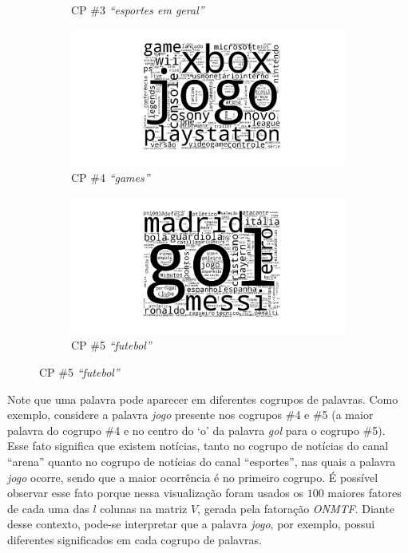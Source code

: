 \documentclass[
    12pt,                %
    oneside,            %
    a4paper,            %
    english,            %
    brazil                %
    ]{abntex2ppgsi}
\begin{document}
\begin{figure}[H]
\begin{subfigure}[b]{0.45\textwidth}
        \caption{CP \#3 \textit{``esportes em geral''}}
    \end{subfigure}
    \begin{subfigure}[b]{0.45\textwidth}
        \includegraphics[width=\textwidth]{img/onmtf-tc-4.png}
        \caption{CP \#4 \textit{``games''}}
    \end{subfigure}
    \begin{subfigure}[b]{0.45\textwidth}
        \includegraphics[width=\textwidth]{img/onmtf-tc-5.png}
        \caption{CP \#5 \textit{``futebol''}}
    \end{subfigure}
\label{fig:onmtf:wordcloud}
\end{figure}

Note que uma palavra pode aparecer em diferentes cogrupos de palavras. Como exemplo, considere a palavra \textit{jogo} presente nos cogrupos \#4 e \#5 (a maior palavra do cogrupo \#4 e no centro do `o' da palavra \textit{gol} para o cogrupo \#5). Esse fato significa que existem notícias, tanto no cogrupo de notícias do canal ``arena'' quanto no cogrupo de notícias do canal ``esportes'', nas quais a palavra \textit{jogo} ocorre, sendo que a maior ocorrência é no primeiro cogrupo. É possível observar esse fato porque nessa visualização foram usados os $100$ maiores fatores de cada uma das $l$ colunas na matriz $V$, gerada pela fatoração \textit{ONMTF}. Diante desse contexto, pode-se interpretar que a palavra \textit{jogo}, por exemplo, possui diferentes significados em cada cogrupo de palavras.
\end{document}

